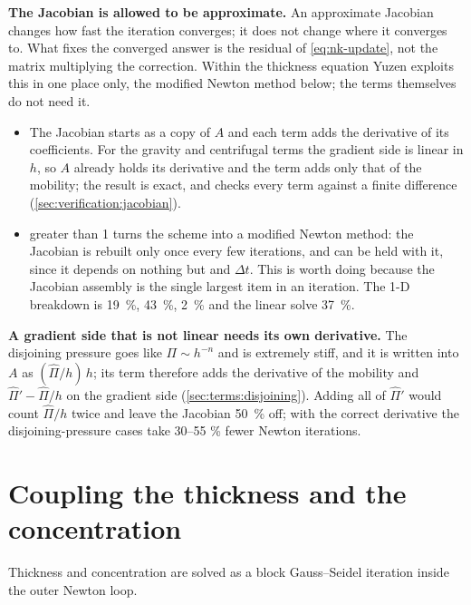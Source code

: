 \textbf{The Jacobian is allowed to be approximate.} An approximate Jacobian
changes how fast the iteration converges; it does not change where it converges
to. What fixes the converged answer is the residual  of
\cref{eq:nk-update}, not the matrix multiplying the correction. Within the
thickness equation Yuzen exploits this in one place only, the modified Newton
method below; the terms themselves do not need it.

\begin{itemize}
  \item The Jacobian starts as a copy of $A$ and each term adds the
    derivative of its coefficients. For the gravity and centrifugal terms the
    gradient side is linear in $h$, so $A$ already holds its derivative and
    the term adds only that of the mobility; the result is exact, and
     checks every term against a finite difference
    (\cref{sec:verification:jacobian}).
  \item {} greater than 1 turns
    the scheme into a modified Newton method: the Jacobian is rebuilt only once
    every few iterations, and  can be held with it, since it
    depends on nothing but  and $\Delta t$. This is worth
    doing because the Jacobian assembly is the single largest item in an
    iteration. The 1-D breakdown is  \SI{19}{\percent},
     \SI{43}{\percent}, 
    \SI{2}{\percent} and the linear solve \SI{37}{\percent}.
\end{itemize}

\textbf{A gradient side that is not linear needs its own derivative.} The
disjoining pressure goes like $\Pi \sim h^{-n}$ and is extremely stiff, and it
is written into $A$ as $(\hat\Pi/h)\,h$; its term therefore adds the
derivative of the mobility and $\hat\Pi' - \hat\Pi/h$ on the gradient side
(\cref{sec:terms:disjoining}). Adding all of $\hat\Pi'$ would count
$\hat\Pi/h$ twice and leave the Jacobian \SI{50}{\percent} off; with the
correct derivative the disjoining-pressure cases take 30--55 \% fewer Newton
iterations.

\section{Coupling the thickness and the concentration}
\label{sec:time:coupling}

Thickness and concentration are solved as a block Gauss--Seidel iteration
inside the outer Newton loop.

